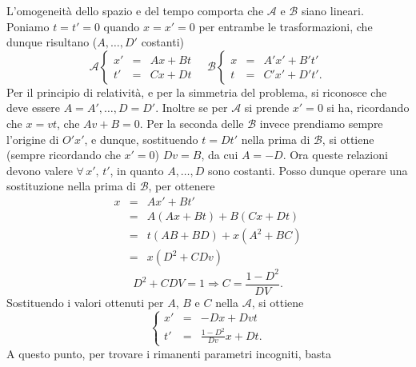  L'omogeneit\`a dello spazio e del tempo comporta che $\mathcal{A}$ e
 $\mathcal{B}$ siano lineari. Poniamo $t=t'=0$ quando $x=x'=0$ per
 entrambe le trasformazioni, che dunque risultano ($A, \ldots, D'$
 costanti)
 \begin{equation}
   \mathcal{A} \left\{
     \begin{array}{rcl}
       x' & = & A x + B t \\
       t' & = & Cx + Dt
     \end{array}
   \right.	
   \quad
   \mathcal{B} \left\{
     \begin{array}{rcl}
       x & = & A' x' + B' t' \\
       t & = & C' x' + D' t'.
     \end{array}
   \right.
   \label{eq:loris}
 \end{equation}
 Per il principio di relativit\`a, e per la simmetria del problema, si
 riconosce che deve essere $A=A', \ldots, D=D'$. Inoltre se per
 $\mathcal{A}$ si prende $x' = 0$ si ha, ricordando che $x = v t$, che
 $A v + B = 0$. Per la seconda delle $\mathcal{B}$ invece prendiamo
 sempre l'origine di $O' x'$, e dunque, sostituendo $t = D t'$ nella
 prima di $\mathcal{B}$, si ottiene (sempre ricordando che $x' = 0$) $D
 v = B$, da cui $A = -D$. Ora queste relazioni devono valere $\forall
 \, x',\,t'$, in quanto $A, \ldots, D$ sono costanti. Posso dunque
 operare una sostituzione nella prima di $\mathcal{B}$, per ottenere
 \begin{eqnarray}
   x & = & A x' + B t' \nonumber \\ 
   & = & A (Ax + Bt) + B (Cx + Dt) \nonumber \\
   & = & t (AB + BD) + x (A^{2} + BC) \nonumber \\
   & = & x (D^{2} + CDv)
 \end{eqnarray}
 \begin{equation}
   D^{2} + CDV  =  1 \Longrightarrow
   C  =  \frac{1-D^{2}}{DV}.
 \end{equation}
 Sostituendo i valori ottenuti per $A, \, B$ e $C$ nella $\mathcal{A}$,
 si ottiene
 \begin{equation}
   \left\{
     \begin{array}{rcl}
       x' & = & -D x + D vt \\
       t' & = & \frac{1-D^{2}}{D v} x + D t.
     \end{array}
   \right.
   \label{eq:loris1}
 \end{equation}
A questo punto, per trovare i rimanenti parametri incogniti, basta
